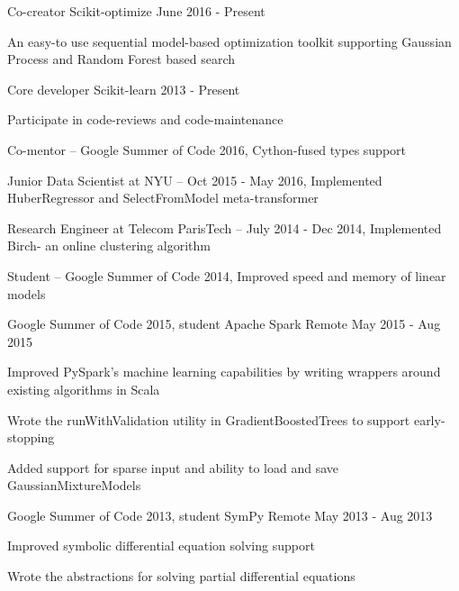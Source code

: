 \begin{cventries}
  \cventry
    {Co-creator}
    {Scikit-optimize}
    {}
    {June 2016 - Present}
    {
      \begin{cvitems}
        \item {An easy-to use sequential model-based optimization toolkit supporting Gaussian Process and Random Forest based search}
      \end{cvitems}
    }
  \cventry
    {Core developer}
    {Scikit-learn}
    {}
    {2013 - Present}
    {
      \begin{cvitems}
        \item {Participate in code-reviews and code-maintenance}
        \item {Co-mentor -- Google Summer of Code 2016, Cython-fused types support}
        \item {Junior Data Scientist at NYU -- Oct 2015 - May 2016, Implemented HuberRegressor and SelectFromModel meta-transformer}
        \item {Research Engineer at Telecom ParisTech -- July 2014 - Dec 2014, Implemented Birch- an online clustering algorithm}
        \item {Student -- Google Summer of Code 2014, Improved speed and memory of linear models}
      \end{cvitems}
    }
  \cventry
    {Google Summer of Code 2015, student}
    {Apache Spark}
    {Remote}
    {May 2015 - Aug 2015}
    {
      \begin{cvitems}
        \item {Improved PySpark's machine learning capabilities by writing wrappers around existing algorithms in Scala}
        \item{Wrote the runWithValidation utility in GradientBoostedTrees to support early-stopping}
        \item{Added support for sparse input and ability to load and save GaussianMixtureModels}
      \end{cvitems}
    }
  \cventry
    {Google Summer of Code 2013, student}
    {SymPy}
    {Remote}
    {May 2013 - Aug 2013}
    {
      \begin{cvitems}
        \item {Improved symbolic differential equation solving support}
        \item {Wrote the abstractions for solving partial differential equations}
      \end{cvitems}
    }
\end{cventries}